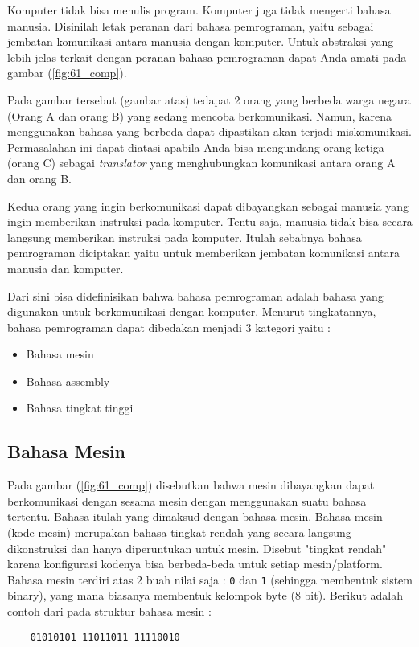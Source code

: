 Komputer tidak bisa menulis program. Komputer juga tidak mengerti bahasa manusia. Disinilah letak peranan dari bahasa pemrograman, yaitu sebagai jembatan komunikasi antara manusia dengan komputer. Untuk abstraksi yang lebih jelas terkait dengan peranan bahasa pemrograman dapat Anda amati pada gambar (\ref{fig:61_comp}). 

Pada gambar tersebut (gambar atas) tedapat 2 orang yang berbeda warga negara (Orang A dan orang B) yang sedang mencoba berkomunikasi. Namun, karena menggunakan bahasa yang berbeda dapat dipastikan akan terjadi miskomunikasi. Permasalahan ini dapat diatasi apabila Anda bisa mengundang orang ketiga (orang C) sebagai \textit{translator} yang menghubungkan komunikasi antara orang A dan orang B. 

Kedua orang yang ingin berkomunikasi dapat dibayangkan sebagai manusia yang ingin memberikan instruksi pada komputer. Tentu saja, manusia tidak bisa secara langsung memberikan instruksi pada komputer. Itulah sebabnya bahasa pemrograman diciptakan yaitu untuk memberikan jembatan komunikasi antara manusia dan komputer. 

Dari sini bisa didefinisikan bahwa bahasa pemrograman adalah bahasa yang digunakan untuk berkomunikasi dengan komputer. Menurut tingkatannya, bahasa pemrograman dapat dibedakan menjadi 3 kategori yaitu :
\begin{itemize}
	\item Bahasa mesin
	\item Bahasa assembly
	\item Bahasa tingkat tinggi
\end{itemize}

\subsection{Bahasa Mesin}
 Pada gambar (\ref{fig:61_comp}) disebutkan bahwa mesin dibayangkan dapat berkomunikasi dengan sesama mesin dengan menggunakan suatu bahasa tertentu. Bahasa itulah yang dimaksud dengan bahasa mesin. Bahasa mesin (kode mesin) merupakan bahasa tingkat rendah yang secara langsung dikonstruksi dan hanya diperuntukan untuk mesin. Disebut "tingkat rendah" karena konfigurasi kodenya bisa berbeda-beda untuk setiap mesin/platform. Bahasa mesin terdiri atas 2 buah nilai saja : \texttt{0} dan \texttt{1} (sehingga membentuk sistem binary), yang mana biasanya membentuk kelompok byte (8 bit). Berikut adalah contoh dari pada struktur bahasa mesin :

\begin{verbatim}
    01010101 11011011 11110010
\end{verbatim}

